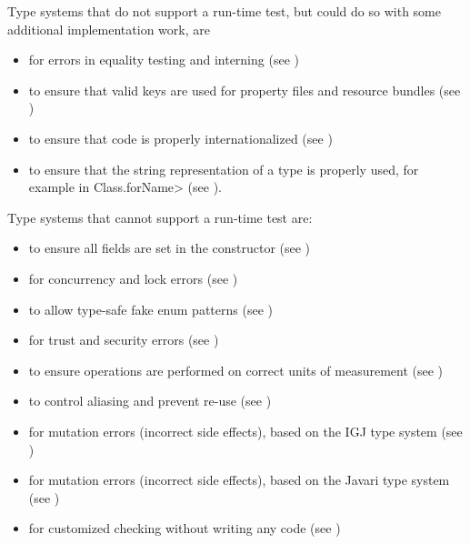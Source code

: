 Type systems that do not support a run-time test, but could do so with some
additional implementation work, are

\begin{itemize}
\item
   for errors in equality
  testing and interning (see )
\item
   to ensure that valid
  keys are used for property files and resource bundles (see
  )
\item
   to
  ensure that code is properly internationalized (see
  )
\item
   to ensure that the
  string representation of a type is properly used, for example in
  \<Class.forName> (see ).
\end{itemize}


Type systems that cannot support a run-time test are:

\begin{itemize}
\item
   to ensure all
  fields are set in the constructor (see
  )
\item
   for concurrency and lock errors
  (see )
\item
   to allow type-safe fake enum
  patterns (see )
\item
   for trust and security errors
  (see )
\item
   to ensure operations are
  performed on correct units of measurement
  (see )
\item
   to control aliasing and prevent
  re-use (see )
\item
   for mutation errors (incorrect
  side effects), based on the IGJ type system (see
  )
\item
   for mutation errors
  (incorrect side effects), based on the Javari type system (see
  )
\item
   for customized checking without
  writing any code (see )
\end{itemize}



